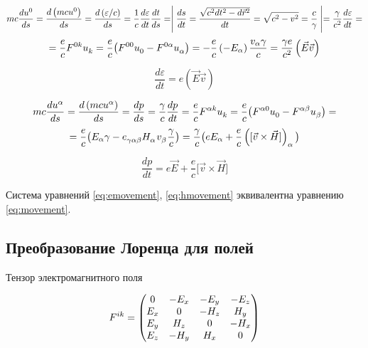 \documentclass{article}
\begin{document}
\begin{equation*}
    mc\frac{d\tensor{u}{^0}}{ds}=\frac{d\left(mc\tensor{u}{^0}\right)}{ds}=\frac{d\left(\varepsilon/c\right)}{ds}=\frac{1}{c}\frac{d\varepsilon}{dt}\frac{dt}{ds}=\Biggm\lvert\frac{ds}{dt}=\frac{\sqrt{c^2dt^2-d\vec{r}^2}}{dt}=\sqrt{c^2-v^2}=\frac{c}{\gamma}\Biggm\rvert=\frac{\gamma}{c^2}\frac{d\varepsilon}{dt}=
\end{equation*}
\begin{equation*}
    =\frac{e}{c}\tensor{F}{^0^k}\tensor{u}{_k}=\frac{e}{c}\big(\tensor{F}{^0^0}\tensor{u}{_0}-\tensor{F}{^0^\alpha}\tensor{u}{_\alpha}\big)    =-\frac{e}{c}\left(-E_\alpha\right)\frac{v_\alpha\gamma}{c}=\frac{\gamma e}{c^2}\left(\vec{E}\vec{v}\right)
\end{equation*}

\begin{equation}\label{eq:emovement}
    \frac{d\varepsilon}{dt}=e\left(\vec{E}\vec{v}\right)
\end{equation}

\begin{equation*}
    mc\frac{d\tensor{u}{^\alpha}}{ds}=\frac{d\left(mc\tensor{u}{^\alpha}\right)}{ds}=\frac{dp}{ds}=\frac{\gamma}{c}\frac{dp}{dt}=\frac{e}{c}\tensor{F}{^\alpha^k}\tensor{u}{_k}=\frac{e}{c}\big(\tensor{F}{^\alpha^0}\tensor{u}{_0}-\tensor{F}{^\alpha^\beta}\tensor{u}{_\beta}\big)=
\end{equation*}
\begin{equation*}
    =\frac{e}{c}\big(E_\alpha\gamma-\tensor{e}{_\gamma_\alpha_\beta}\tensor{H}{_\alpha}\tensor{v}{_\beta}\frac{\gamma}{c}\big)=\frac{\gamma}{c}\big(eE_\alpha+\frac{e}{c}\left(\lbrack\vec{v}\times\vec{H}\rbrack\right)_\alpha\big)
\end{equation*}

\begin{equation}\label{eq:hmovement}
    \frac{dp}{dt}=e\vec{E}+\frac{e}{c}\lbrack\vec{v}\times\vec{H}\rbrack
\end{equation}

Система уравнений \eqref{eq:emovement}, \eqref{eq:hmovement} эквивалентна уравнению \eqref{eq:movement}.

\subsection{Преобразование Лоренца для полей}

Тензор электромагнитного поля

\begin{equation}
    \tensor{F}{^i^k} =
    \begin{pmatrix}
        0 & -E_x & -E_y & -E_z \\
        E_x & 0 & -H_z & H_y \\
        E_y & H_z & 0 & -H_x \\
        E_z & -H_y & H_x & 0
    \end{pmatrix}
\end{equation}
\end{document}
